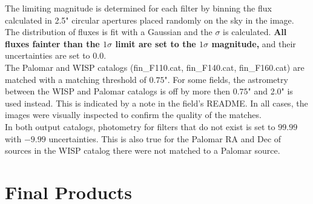 \documentclass{article}
\begin{document}
\noindent The limiting magnitude is determined for each filter by binning the 
flux calculated in 2.5" circular apertures placed randomly on the sky
in the image. The distribution of fluxes is fit with a Gaussian and 
the $\sigma$ is calculated. \textbf{All fluxes fainter than the
$1\sigma$ limit are set to the $1\sigma$ magnitude,} and their uncertainties
are set to $0.0$.  \\

\noindent The Palomar and WISP catalogs 
(fin\_F110.cat, fin\_F140.cat, fin\_F160.cat)
are matched with a matching threshold of $0.75$". For some fields, 
the astrometry between the WISP and Palomar catalogs is off by more then 
$0.75$" and 2.0" is used instead. This is indicated by a note in the
field's README. In all cases, the images were visually inspected 
to confirm the quality of the matches. \\

\noindent In both output catalogs, photometry for filters that do not exist 
is set
to $99.99$ with $-9.99$ uncertainties. This is also true for the Palomar
RA and Dec of sources in the WISP catalog there were not matched to a 
Palomar source.

\section{Final Products}
\end{document}
